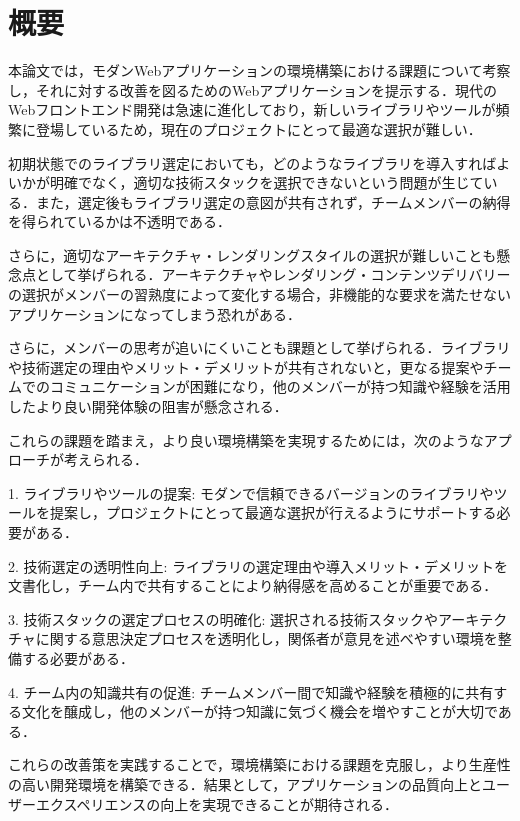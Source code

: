 \documentclass[main]{subfiles}
\begin{document}
\section{概要 }

本論文では，モダンWebアプリケーションの環境構築における課題について考察し，それに対する改善を図るためのWebアプリケーションを提示する．現代のWebフロントエンド開発は急速に進化しており，新しいライブラリやツールが頻繁に登場しているため，現在のプロジェクトにとって最適な選択が難しい．

初期状態でのライブラリ選定においても，どのようなライブラリを導入すればよいかが明確でなく，適切な技術スタックを選択できないという問題が生じている．また，選定後もライブラリ選定の意図が共有されず，チームメンバーの納得を得られているかは不透明である．

さらに，適切なアーキテクチャ・レンダリングスタイルの選択が難しいことも懸念点として挙げられる．アーキテクチャやレンダリング・コンテンツデリバリーの選択がメンバーの習熟度によって変化する場合，非機能的な要求を満たせないアプリケーションになってしまう恐れがある．

さらに，メンバーの思考が追いにくいことも課題として挙げられる．ライブラリや技術選定の理由やメリット・デメリットが共有されないと，更なる提案やチームでのコミュニケーションが困難になり，他のメンバーが持つ知識や経験を活用したより良い開発体験の阻害が懸念される．

これらの課題を踏まえ，より良い環境構築を実現するためには，次のようなアプローチが考えられる．

1. ライブラリやツールの提案: モダンで信頼できるバージョンのライブラリやツールを提案し，プロジェクトにとって最適な選択が行えるようにサポートする必要がある．

2. 技術選定の透明性向上: ライブラリの選定理由や導入メリット・デメリットを文書化し，チーム内で共有することにより納得感を高めることが重要である．

3. 技術スタックの選定プロセスの明確化: 選択される技術スタックやアーキテクチャに関する意思決定プロセスを透明化し，関係者が意見を述べやすい環境を整備する必要がある．

4. チーム内の知識共有の促進: チームメンバー間で知識や経験を積極的に共有する文化を醸成し，他のメンバーが持つ知識に気づく機会を増やすことが大切である．

これらの改善策を実践することで，環境構築における課題を克服し，より生産性の高い開発環境を構築できる．結果として，アプリケーションの品質向上とユーザーエクスペリエンスの向上を実現できることが期待される．
\end{document}
